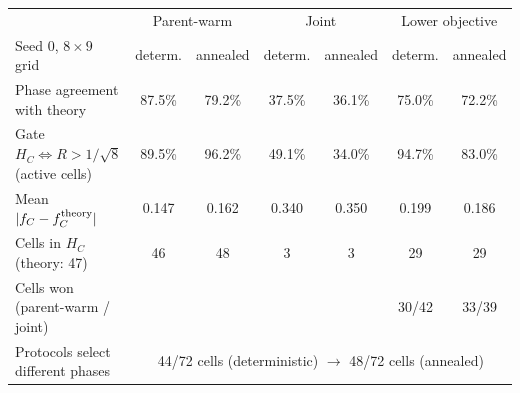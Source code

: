 \documentclass[10pt]{article}
\begin{document}
\begin{center}
\small\setlength{\tabcolsep}{4pt}
\begin{tabular}{@{}lcccccc@{}}
\toprule
 & \multicolumn{2}{c}{Parent-warm} & \multicolumn{2}{c}{Joint} & \multicolumn{2}{c}{Lower objective} \\
Seed 0, $8\times9$ grid & determ. & annealed & determ. & annealed & determ. & annealed \\
\midrule
Phase agreement with theory & 87.5\% & 79.2\% & 37.5\% & 36.1\% & 75.0\% & 72.2\% \\
Gate $H_C\Leftrightarrow R>1/\sqrt8$ (active cells) & 89.5\% & 96.2\% & 49.1\% & 34.0\% & 94.7\% & 83.0\% \\
Mean $|f_C-f_C^{\rm theory}|$ & 0.147 & 0.162 & 0.340 & 0.350 & 0.199 & 0.186 \\
Cells in $H_C$ (theory: 47) & 46 & 48 & 3 & 3 & 29 & 29 \\
Cells won (parent-warm / joint) & & & & & 30/42 & 33/39 \\
\midrule
Protocols select different phases & \multicolumn{6}{c}{44/72 cells (deterministic) $\to$ 48/72 cells (annealed)} \\
\bottomrule
\end{tabular}
\end{center}
\end{document}
